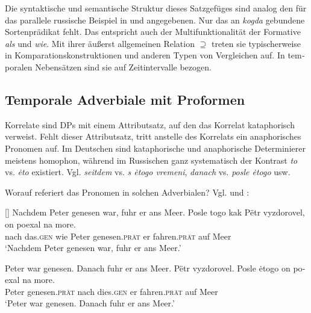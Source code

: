 \documentclass[output=paper, colorlinks, citecolor=brown, booklanguage=german]{langscibook}
\begin{document}
\begin{otherlanguage}{german}
\noindent Die syntaktische und semantische Struktur dieses Satzgefüges sind analog den für das parallele russische Beispiel in  und  angegebenen. Nur das an \textit{kogda} gebundene Sortenprädikat fehlt. Das entspricht auch der Mul\-ti\-funk\-tio\-na\-li\-tät der Formative \textit{als} und \textit{wie}. Mit ihrer äußerst allgemeinen Relation $\supseteq$ treten sie typischerweise in Komparationskonstruktionen und anderen Typen von Vergleichen auf. In temporalen Nebensätzen sind sie auf Zeitintervalle bezogen.

\subsection{Temporale Adverbiale mit Proformen} \label{subsec:18:3.5}

Korrelate sind DPs mit einem Attributsatz, auf den das Korrelat kataphorisch verweist. Fehlt dieser Attributsatz, tritt anstelle des Korrelats ein anaphorisches Pronomen auf. Im Deutschen sind kataphorische und anaphorische De\-ter\-mi\-nie\-rer meistens homophon, während im Russischen ganz systematisch der Kontrast \textit{to} vs. \textit{ėto} existiert. Vgl. \textit{seitdem} vs. \textit{s ėtogo vremeni}, \textit{danach} vs. \textit{posle ėtogo} usw.

Worauf referiert das Pronomen in solchen Adverbialen? Vgl.  und :

\begin{exe}
[]{
\ea Nachdem Peter genesen war, fuhr er ans Meer.
\ex
\gll Posle togo kak Pëtr vyzdorovel, on poexal na more.\\
nach das.\textsc{gen} wie Peter genesen.\textsc{prät} er fahren.\textsc{prät} auf Meer\\
\glt    ‘Nachdem Peter genesen war, fuhr er ans Meer.’
\z
}
\end{exe}




\ea \label{ex:18:45}
	\ea \label{ex:18:45a} Peter war genesen. Danach fuhr er ans Meer.
	\ex \label{ex:18:45b}
    \gll Pëtr vyzdorovel. Posle {\.e}togo on poexal na more.\\
         Peter genesen.\textsc{prät} nach dies.\textsc{gen} er fahren.\textsc{prät} auf Meer\\
         \glt ‘Peter war genesen. Danach fuhr er ans Meer.’
\z
\z


\end{otherlanguage}
\end{document}
